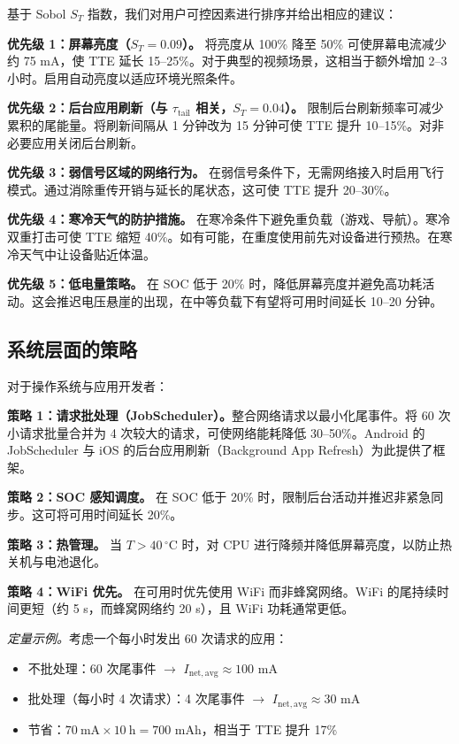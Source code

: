 \documentclass[11pt,a4paper]{ctexart}
\begin{document}
基于 Sobol $S_T$ 指数，我们对用户可控因素进行排序并给出相应的建议：

\textbf{优先级 1：屏幕亮度（$S_T = 0.09$）。}
将亮度从 100\% 降至 50\% 可使屏幕电流减少约 75 mA，使 TTE 延长 15--25\%。对于典型的视频场景，这相当于额外增加 2--3 小时。启用自动亮度以适应环境光照条件。

\textbf{优先级 2：后台应用刷新（与 $\tau_{\mathrm{tail}}$ 相关，$S_T = 0.04$）。}
限制后台刷新频率可减少累积的尾能量。将刷新间隔从 1 分钟改为 15 分钟可使 TTE 提升 10--15\%。对非必要应用关闭后台刷新。

\textbf{优先级 3：弱信号区域的网络行为。}
在弱信号条件下，无需网络接入时启用飞行模式。通过消除重传开销与延长的尾状态，这可使 TTE 提升 20--30\%。

\textbf{优先级 4：寒冷天气的防护措施。}
在寒冷条件下避免重负载（游戏、导航）。寒冷双重打击可使 TTE 缩短 40\%。如有可能，在重度使用前先对设备进行预热。在寒冷天气中让设备贴近体温。

\textbf{优先级 5：低电量策略。}
在 SOC 低于 20\% 时，降低屏幕亮度并避免高功耗活动。这会推迟电压悬崖的出现，在中等负载下有望将可用时间延长 10--20 分钟。

\subsection{系统层面的策略}

对于操作系统与应用开发者：

\textbf{策略 1：请求批处理（JobScheduler）。}整合网络请求以最小化尾事件。将 60 次小请求批量合并为 4 次较大的请求，可使网络能耗降低 30--50\%。Android 的 JobScheduler 与 iOS 的后台应用刷新（Background App Refresh）为此提供了框架。

\textbf{策略 2：SOC 感知调度。}
在 SOC 低于 20\% 时，限制后台活动并推迟非紧急同步。这可将可用时间延长 20\%。

\textbf{策略 3：热管理。}
当 $T > 40\,^{\circ}$C 时，对 CPU 进行降频并降低屏幕亮度，以防止热关机与电池退化。

\textbf{策略 4：WiFi 优先。}
在可用时优先使用 WiFi 而非蜂窝网络。WiFi 的尾持续时间更短（约 5 s，而蜂窝网络约 20 s），且 WiFi 功耗通常更低。

\textit{定量示例。}考虑一个每小时发出 60 次请求的应用：
\begin{itemize}[leftmargin=2em]
\item 不批处理：60 次尾事件 $\to$ $I_{\mathrm{net,avg}} \approx 100$ mA
\item 批处理（每小时 4 次请求）：4 次尾事件 $\to$ $I_{\mathrm{net,avg}} \approx 30$ mA
\item 节省：$70\ \mathrm{mA}\times 10\ \mathrm{h} = 700$ mAh，相当于 TTE 提升 17\%
\end{itemize}
\end{document}
